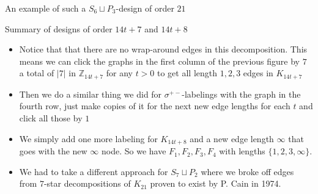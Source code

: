 \documentclass{beamer}
\theoremstyle{plain}
\newcommand{\ZZ}{\ensuremath{\mathbb{Z}}}
\begin{document}
\begin{frame}{An example of such a $S_{6}\sqcup P_{3}$-design of order $21$}
\end{frame}

\begin{frame}{Summary of designs of order $14t+7$ and $14t+8$}
\begin{itemize}
\item Notice that that there are no wrap-around edges in this decomposition. This means we can click the graphs in the first column of the previous figure by $7$ a total of $|7|$ in $\ZZ_{14t+7}$ for any $t>0$ to get all length $1,2,3$ edges in $K_{14t+7}$
\item Then we do a similar thing we did for $\sigma^{+-}$-labelings with the graph in the fourth row, just make copies of it for the next new edge lengths for each $t$ and click all those by $1$
\item We simply add one more labeling for $K_{14t+8}$ and a new edge length $\infty$ that goes with the new $\infty$ node. So we have $F_{1},F_{2},F_{3},F_{4}$ with lengths $\{1,2,3,\infty\}$.
\item We had to take a different approach for $S_{7}\sqcup P_{2}$ where we broke off edges from $7$-star decompositions of $K_{21}$ proven to exist by P. Cain in 1974.
\end{itemize}
\end{frame}
\end{document}
